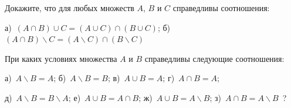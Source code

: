 
\begin{thm}
Докажите, что для любых множеств $A$, $B$ и $C$ справедливы соотношения:
\par
а)~$(A \cap B) \cup C = (A \cup C) \cap (B \cup C)$;
б)~$(A \cap B) \backslash C = (A \backslash C) \cap (B \backslash C)$
\end{thm}

\begin{thm}
При каких условиях множества $A$ и $B$ справедливы следующие соотношения:
\par
а)~$A \backslash B = A$; \hfill
б)~$A \backslash B = B$; \hfill
в)~$A \cup B = A$; \hfill
г)~$A \cap B = A$; 
\par
д)~$A \backslash B = B \backslash A$; \hfill
е)~$A \cup B = A \cap B$; \hfill
ж)~$A \cup B = A \backslash B$; \hfill
з)~$A \cap B = A \backslash B$~?
\end{thm}



